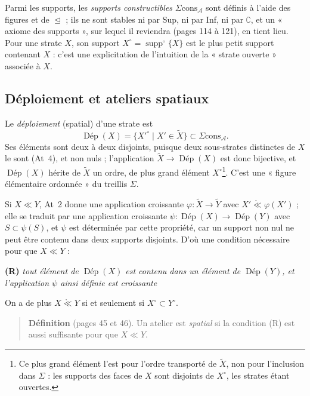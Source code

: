 \documentclass[11pt,a4paper]{article}
\begin{document}
Parmi les supports, les \emph{supports constructibles}
$\Sigma\mathrm{cons}_{\mathcal{A}}$ sont définis à l'aide des figures et de
$\trianglelefteq$ ; ils ne sont stables ni par Sup, ni par Inf, ni par
$\complement$, et un « axiome des supports », sur lequel il reviendra (pages 114
à 121), en tient lieu. Pour une strate $X$, son support $X^{\circ} =
\operatorname{supp}^{\circ}\{X\}$ est le plus petit support contenant $X$ : c'est une explicitation de l'intuition de la « strate ouverte » associée à $X$.

\subsection*{Déploiement et ateliers spatiaux}

Le \emph{déploiement} (spatial) d'une strate est
\[
\operatorname{\text{Dép}}(X) = \{ X'^{\circ} \mid X' \in \widetilde{X} \}
\subset \Sigma\mathrm{cons}_{\mathcal{A}} .
\]
Ses éléments sont deux à deux disjoints, puisque deux sous-strates distinctes de
$X$ le sont (At~4), et non nuls ; l'application $\widetilde{X} \to
\operatorname{\text{Dép}}(X)$ est donc bijective, et
$\operatorname{\text{Dép}}(X)$ hérite de $\widetilde{X}$ un ordre, de plus grand
élément $X^{\circ}$\footnote{Ce plus grand élément l'est pour l'ordre transporté
de $\widetilde{X}$, non pour l'inclusion dans $\Sigma$ : les supports des faces
de $X$ sont disjoints de $X^{\circ}$, les strates étant ouvertes.}. C'est une
« figure élémentaire ordonnée » du treillis $\Sigma$.

Si $X \ll Y$, At~2 donne une application croissante $\varphi : \widetilde{X} \to
\widetilde{Y}$ avec $X' \mathrel{\mathring{\ll}} \varphi(X')$ ; elle se traduit
par une application croissante $\psi : \operatorname{\text{Dép}}(X) \to
\operatorname{\text{Dép}}(Y)$ avec $S \subset \psi(S)$, et $\psi$ est déterminée
par cette propriété, car un support non nul ne peut être contenu dans deux
supports disjoints. D'où une condition nécessaire pour que $X \ll Y$ :

\textbf{(R)} \emph{tout élément de $\operatorname{\text{Dép}}(X)$ est contenu
dans un élément de $\operatorname{\text{Dép}}(Y)$, et l'application $\psi$ ainsi
définie est croissante}

On a de plus $X \mathrel{\mathring{\ll}} Y$ si et seulement si
$X^{\circ} \subset Y^{\circ}$.

\begin{quote}
\textbf{Définition} (pages 45 et 46). Un atelier est \emph{spatial} si la
condition (R) est aussi suffisante pour que $X \ll Y$.
\end{quote}
\end{document}
